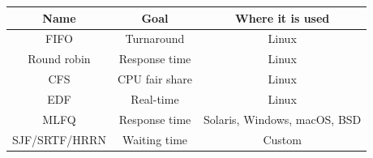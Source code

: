 \begin{table}[H]
    \centering
    \begin{tabular}{|c|c|c|}
    \hline
    \textbf{Name} & \textbf{Goal}  & \textbf{Where it is used}    \\ \hline
    FIFO          & Turnaround     & Linux                        \\
    Round robin   & Response time  & Linux                        \\
    CFS           & CPU fair share & Linux                        \\
    EDF           & Real-time      & Linux                        \\
    MLFQ          & Response time  & Solaris, Windows, macOS, BSD \\
    SJF/SRTF/HRRN & Waiting time   & Custom                       \\ \hline
    \end{tabular}
\end{table}




